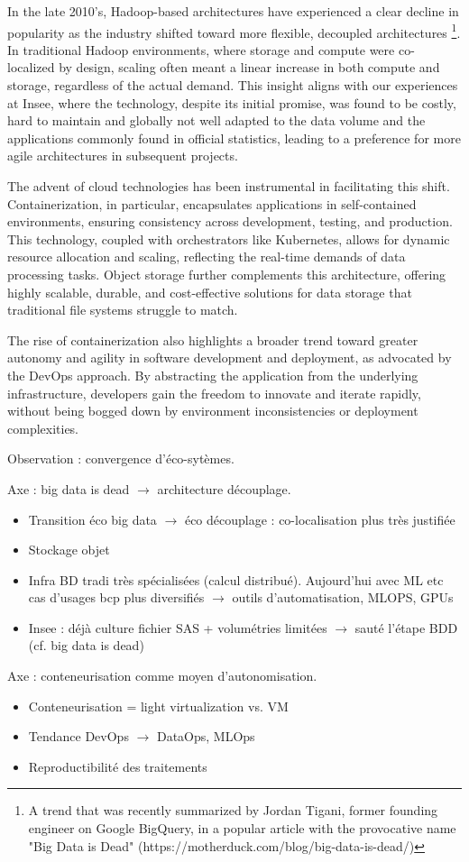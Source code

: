 In the late 2010's, Hadoop-based architectures have experienced a clear decline in popularity as the industry shifted toward more flexible, decoupled architectures \footnote{A trend that was recently summarized by Jordan Tigani, former founding engineer on Google BigQuery, in a popular article with the provocative name "Big Data is Dead" (https://motherduck.com/blog/big-data-is-dead/)}. In traditional Hadoop environments, where storage and compute were co-localized by design, scaling often meant a linear increase in both compute and storage, regardless of the actual demand. This insight aligns with our experiences at Insee, where the technology, despite its initial promise, was found to be costly, hard to maintain and globally not well adapted to the data volume and the applications commonly found in official statistics, leading to a preference for more agile architectures in subsequent projects.

The advent of cloud technologies has been instrumental in facilitating this shift. Containerization, in particular, encapsulates applications in self-contained environments, ensuring consistency across development, testing, and production. This technology, coupled with orchestrators like Kubernetes, allows for dynamic resource allocation and scaling, reflecting the real-time demands of data processing tasks. Object storage further complements this architecture, offering highly scalable, durable, and cost-effective solutions for data storage that traditional file systems struggle to match. 

The rise of containerization also highlights a broader trend toward greater autonomy and agility in software development and deployment, as advocated by the DevOps approach. By abstracting the application from the underlying infrastructure, developers gain the freedom to innovate and iterate rapidly, without being bogged down by environment inconsistencies or deployment complexities. 






Observation : convergence d'éco-sytèmes.

Axe : big data is dead $\rightarrow$ architecture découplage.
\begin{itemize}
    \item Transition éco big data $\rightarrow$ éco découplage : co-localisation plus très justifiée
    \item Stockage objet
    \item Infra BD tradi très spécialisées (calcul distribué). Aujourd'hui avec ML etc cas d'usages bcp plus diversifiés $\rightarrow$ outils d'automatisation, MLOPS, GPUs
    \item Insee : déjà culture fichier SAS + volumétries limitées $\rightarrow$ sauté l'étape BDD (cf. big data is dead)
\end{itemize}

Axe : conteneurisation comme moyen d'autonomisation.
\begin{itemize}
    \item Conteneurisation = light virtualization vs. VM
    \item Tendance DevOps $\rightarrow$ DataOps, MLOps
    \item Reproductibilité des traitements
\end{itemize}